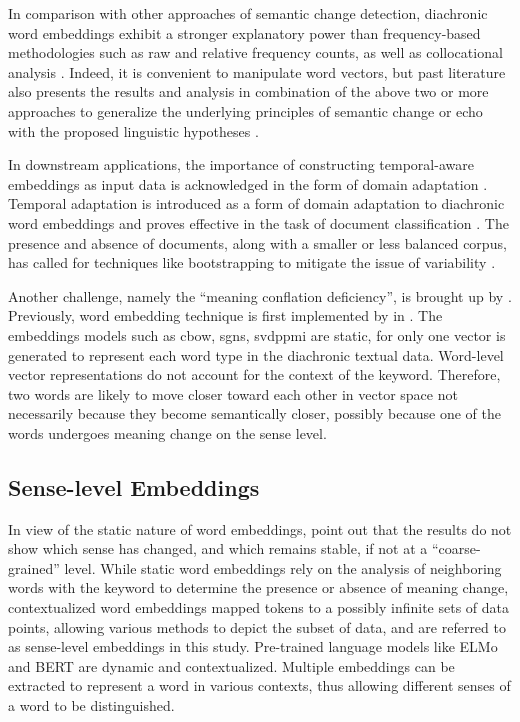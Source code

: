 In comparison with other approaches of semantic change detection, diachronic word embeddings exhibit a stronger explanatory power than frequency-based methodologies such as raw and relative frequency counts, as well as collocational analysis \parencite{kutuzov2018survey}. Indeed, it is convenient to manipulate word vectors, but past literature also presents the results and analysis in combination of the above two or more approaches to generalize the underlying principles of semantic change or echo with the proposed linguistic hypotheses \parencite{tahmasebi2018survey}.

In downstream applications, the importance of constructing temporal-aware embeddings as input data is acknowledged in the form of domain adaptation \parencite{huang2019neural}. Temporal adaptation is introduced as a form of domain adaptation to diachronic word embeddings and proves effective in the task of document classification \parencite{huang2019neural}. The presence and absence of documents, along with a smaller or less balanced corpus, has called for techniques like bootstrapping to mitigate the issue of variability \parencite{antoniak2018evaluating}.

Another challenge, namely the ``meaning conflation deficiency'', is brought up by \textcite{camacho2018survey}. Previously, word embedding technique is first implemented by \citeauthor{mikolov2013efficient} in \citeyear{mikolov2013efficient}. The embeddings models such as \gls{cbow}, \gls{sgns}, \gls{svdppmi} are static, for only one vector is generated to represent each word type in the diachronic textual data. Word-level vector representations do not account for the context of the keyword. Therefore, two words are likely to move closer toward each other in vector space not necessarily because they become semantically closer, possibly because one of the words undergoes meaning change on the sense level.

\subsection{Sense-level Embeddings}
In view of the static nature of word embeddings, \textcite{hu2019diachronic} point out that the results do not show which sense has changed, and which remains stable, if not at a ``coarse-grained'' level. While static word embeddings rely on the analysis of neighboring words with the keyword to determine the presence or absence of meaning change, contextualized word embeddings mapped tokens to a possibly infinite sets of data points, allowing various methods to depict the subset of data, and are referred to as sense-level embeddings in this study. Pre-trained language models like ELMo and BERT are dynamic and contextualized. Multiple embeddings can be extracted to represent a word in various contexts, thus allowing different senses of a word to be distinguished.

